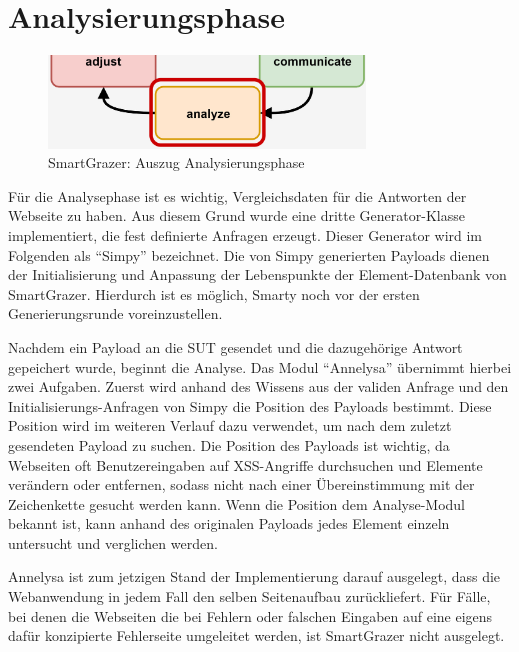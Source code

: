\section{Analysierungsphase}\label{sec:analyze}

\begin{figure}[htbp] 
	\centering
	\includegraphics[width=0.75\textwidth]{contents/images/SmartGrazerSectionAnalyze}
	\caption{SmartGrazer: Auszug Analysierungsphase}
	\label{fig:SmartGrazerSectionAnalyze}
\end{figure}

Für die Analysephase ist es wichtig, Vergleichsdaten für die Antworten der Webseite zu haben. Aus diesem Grund wurde eine dritte Generator-Klasse implementiert, die fest definierte Anfragen erzeugt. Dieser Generator wird im Folgenden als ``Simpy'' bezeichnet. Die von Simpy generierten Payloads dienen der Initialisierung und Anpassung der Lebenspunkte der Element-Datenbank von SmartGrazer. Hierdurch ist es möglich, Smarty noch vor der ersten Generierungsrunde voreinzustellen.

Nachdem ein Payload an die SUT gesendet und die dazugehörige Antwort gepeichert wurde, beginnt die Analyse. Das Modul ``Annelysa'' übernimmt hierbei zwei Aufgaben. Zuerst wird anhand des Wissens aus der validen Anfrage und den Initialisierungs-Anfragen von Simpy die Position des Payloads bestimmt. Diese Position wird im weiteren Verlauf dazu verwendet, um nach dem zuletzt gesendeten Payload zu suchen. Die Position des Payloads ist wichtig, da Webseiten oft Benutzereingaben auf XSS-Angriffe durchsuchen und Elemente verändern oder entfernen, sodass nicht nach einer Übereinstimmung mit der Zeichenkette gesucht werden kann. Wenn die Position dem Analyse-Modul bekannt ist, kann anhand des originalen Payloads jedes Element einzeln untersucht und verglichen werden.

Annelysa ist zum jetzigen Stand der Implementierung darauf ausgelegt, dass die Webanwendung in jedem Fall den selben Seitenaufbau zurückliefert. Für Fälle, bei denen die Webseiten die bei Fehlern oder falschen Eingaben auf eine eigens dafür konzipierte Fehlerseite umgeleitet werden, ist SmartGrazer nicht ausgelegt.

